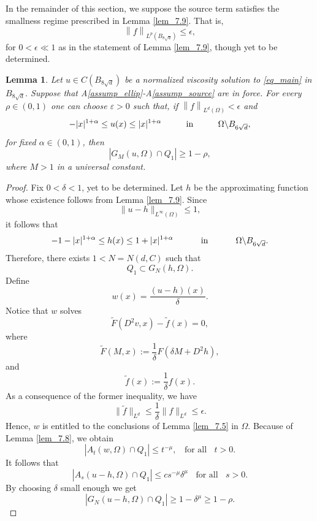 \documentclass[10pt]{article} %
\newtheorem{Lemma}{Lemma}
\begin{document}
In the remainder of this section, we suppose the source term satisfies the smallness regime prescribed in Lemma \ref{lem_7.9}. That is,
\[
	\left\|f\right\|_{L^p(B_{8\sqrt{d}})} \leq \epsilon,
\]
for $0<\epsilon\ll1$ as in the statement of Lemma \ref{lem_7.9}, though yet to be determined.

\begin{Lemma}\label{lem_7.10}
Let $u \in   C (B_{8\sqrt{d}})$ be a normalized viscosity solution to \eqref{eq_main} in $B_{8\sqrt{d}}$. Suppose that A\ref{assump_ellip}-A\ref{assump_source} are in force. For every $\rho\in(0,1)$ one can choose $\varepsilon>0$ such that, if $\left\|f\right\|_{L^d(\Omega)}<\epsilon$ and
\[
	-|x|^{1+\alpha} \leq u(x) \leq |x|^{1+\alpha}\hspace{.4in} \mbox{in}\hspace{.4in} \Omega\backslash B_{6\sqrt{d}},
\]
for fixed $\alpha\in(0,1)$, then 
\begin{equation}\label{eq_10}
|G_M(u,\Omega)\cap Q_1| \geq 1-\rho,
\end{equation}
where $M>1$ in a universal constant.
\end{Lemma}
\begin{proof}
Fix $0< \delta < 1$, yet to be determined. Let $h$ be the approximating function whose existence follows from Lemma \ref{lem_7.9}. 
Since
\[
\|u-h\|_{L^\infty(\Omega)} \leq 1,
\]
it follows that
\[
-1-|x|^{1+\alpha} \leq h(x) \leq 1+|x|^{1+\alpha} \hspace{.4in}\text{ in }\hspace{.4in}\Omega\backslash B_{6\sqrt{d}}.
\]
Therefore, there exists $1<N=N(d,C)$ such that
\begin{equation}\label{eq_11}
Q_1 \subset G_N(h, \Omega).
\end{equation}
Define
\[
w(x)=\frac{(u-h)(x)}{\delta}.
\]
Notice that $w$ solves
\[
	\tilde{F}(D^2v,x) - \tilde{f}(x) = 0,
\]
where
\[
\tilde{F}(M,x) := \frac{1}{\delta}F\left(\delta M + D^2h\right), 
\]
and
\[
\tilde{f}(x) := \frac{1}{\delta}f(x).
\]
As a consequence of the former inequality, we have
\[
	\|\tilde{f}\|_{L^d} \leq \frac{1}{\delta}\|f\|_{L^d} \leq \epsilon. 
\]
Hence, $w$ is entitled to the conclusions of Lemma \ref{lem_7.5} in $\Omega$. Because of Lemma \ref{lem_7.8}, we obtain
\[
|A_t(w,\Omega)\cap Q_1|\leq t^{-\mu}, \;\;\text{ for all }\;\;t>0.
\]
It follows that
\[
|A_s(u-h, \Omega)\cap Q_1| \leq cs^{-\mu}\delta^\mu\;\;\text{ for all }\;\;s>0.
\]
By choosing $\delta$ small enough we get
\[
|G_N(u-h, \Omega)\cap Q_1| \geq 1-\delta^\mu \geq 1-\rho.
\]
\end{proof}
\end{document}
